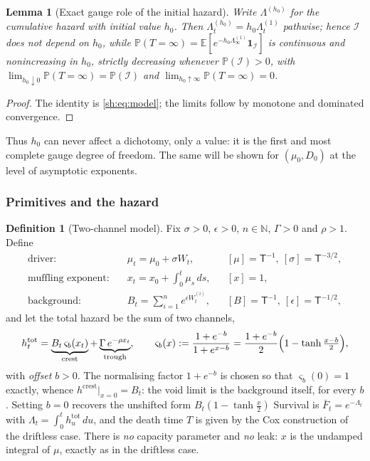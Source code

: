 \documentclass[11pt]{article}
\numberwithin{equation}{section}
\theoremstyle{plain}
\newtheorem{lemma}[theorem]{Lemma}
\theoremstyle{definition}
\newtheorem{definition}[theorem]{Definition}
\theoremstyle{remark}
\newcommand{\E}{\mathbb{E}}
\newcommand{\PP}{\mathbb{P}}
\newcommand{\one}{\mathbf{1}}
\newcommand{\Imm}{\mathcal{I}}
\begin{document}
\begin{lemma}[Exact gauge role of the initial hazard]\label{sh:lem:hgauge}
Write $\Lambda^{(h_0)}$ for the cumulative hazard with initial value $h_0$.
Then $\Lambda^{(h_0)}_t=h_0\Lambda^{(1)}_t$ pathwise; hence $\Imm$ does not
depend on $h_0$, while
$\PP(T=\infty)=\E[e^{-h_0\Lambda^{(1)}_\infty}\one_\Imm]$ is continuous and
nonincreasing in $h_0$, strictly decreasing whenever $\PP(\Imm)>0$, with
$\lim_{h_0\downarrow0}\PP(T=\infty)=\PP(\Imm)$ and
$\lim_{h_0\uparrow\infty}\PP(T=\infty)=0$.
\end{lemma}

\begin{proof}
The identity is \eqref{sh:eq:model}; the limits follow by monotone and
dominated convergence.
\end{proof}

Thus $h_0$ can never affect a dichotomy, only a value: it is the first and
most complete gauge degree of freedom. The same will be shown for
$(\mu_0,D_0)$ at the level of asymptotic exponents.

\subsubsection{Primitives and the hazard}\label{tc:subsub:primitives}

\begin{definition}[Two-channel model]\label{tc:def:model}
Fix $\sigma>0$, $\epsilon>0$, $n\in\mathbb N$, $\Gamma>0$ and
$\rho>1$. Define
\begin{align}
\text{driver:}&\quad \mu_t=\mu_0+\sigma W_t,
&&[\mu]=\mathsf T^{-1},\ [\sigma]=\mathsf T^{-3/2},
\label{tc:eq:driver}\\
\text{muffling exponent:}&\quad x_t=x_0+\int_0^t\mu_s\,ds,
&&[x]=1,
\label{tc:eq:x}\\
\text{background:}&\quad B_t=\sum_{i=1}^{n}e^{\epsilon W^{(i)}_t},
&&[B]=\mathsf T^{-1},\ [\epsilon]=\mathsf T^{-1/2},
\label{tc:eq:B}
\end{align}
and let the total hazard be the sum of two channels,
\begin{equation}\label{tc:eq:hazard}
h^{\mathrm{tot}}_t
=\underbrace{B_t\,\varsigma_b(x_t)}_{\text{crest}}
+\underbrace{\Gamma\,e^{-\rho x_t}}_{\text{trough}},
\qquad
\varsigma_b(x):=\frac{1+e^{-b}}{1+e^{x-b}}
=\frac{1+e^{-b}}{2}\Bigl(1-\tanh\tfrac{x-b}{2}\Bigr),
\end{equation}
with \emph{offset} $b>0$. The normalising factor $1+e^{-b}$ is chosen so
that $\varsigma_b(0)=1$ exactly, whence $h^{\mathrm{crest}}|_{x=0}=B_t$:
the void limit is the background itself, for every $b$. Setting $b=0$
recovers the unshifted form $B_t(1-\tanh\frac{x}{2})$
Survival is $\bar F_t=e^{-\Lambda_t}$ with
$\Lambda_t=\int_0^t h^{\mathrm{tot}}_u\,du$, and the death time $T$ is
given by the Cox construction of the driftless case. There is \emph{no}
capacity parameter and \emph{no} leak: $x$ is the undamped integral of
$\mu$, exactly as in the driftless case.
\end{definition}
\end{document}
